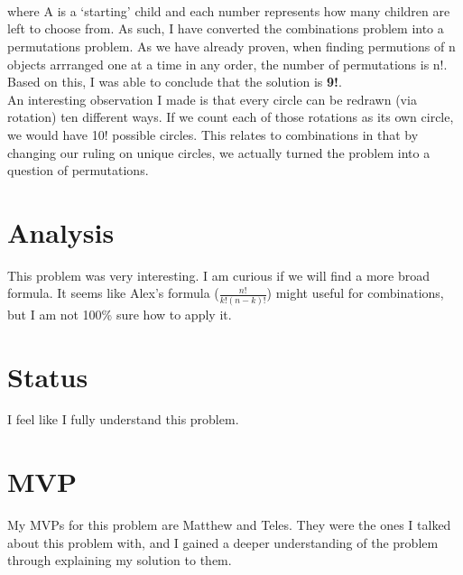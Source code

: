\documentclass[11pt]{article} %
\newcommand\tab[1][1cm]{\hspace*{#1}}
\begin{document}
\\
\\
\\ \tab
where A is a `starting' child and each number represents how many children are left to choose from. As such, I have converted the combinations problem into a permutations problem. As we have already proven, when finding permutions of n objects arrranged one at a time in any order, the number of permutations is n!. Based on this, I was able to conclude that the solution is \textbf{9!}. 
\\  \tab An interesting observation I made is that every circle can be redrawn (via rotation) ten different ways. If we count each of those rotations as its own circle, we would have 10! possible circles. This relates to combinations in that by changing our ruling on unique circles, we actually turned the problem into a question of permutations. 

\section* {Analysis}
\tab This problem was very interesting. I am curious if we will find a more broad formula. It seems like Alex's formula ($\frac{n!}{k!(n-k)!}$) might useful for combinations, but I am not 100\% sure how to apply it. 

\section* {Status}
\tab I feel like I fully understand this problem.

\section* {MVP}
\tab My MVPs for this problem are Matthew and Teles. They were the ones I talked about this problem with, and I gained a deeper understanding of the problem through explaining my solution to them.
\end{document}

